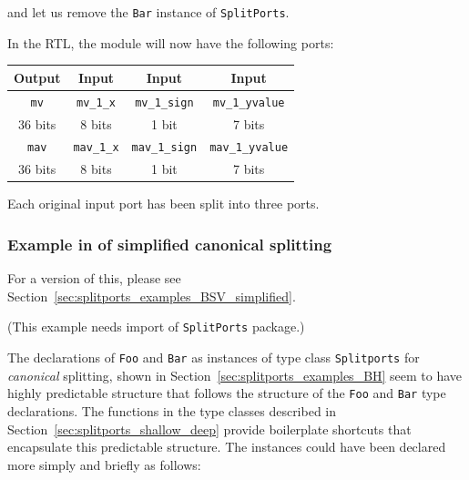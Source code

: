 and let us remove the {\tt Bar} instance of {\tt SplitPorts}.

In the RTL, the module will now have the following ports:

\begin{center}
  \begin{tabular}{|c||c|c|c|}
    \hline
     Output &
     Input  &
     Input  &
     Input  \\
    \hline
     {\tt mv}            &
     {\tt mv\_1\_x}      &
     {\tt mv\_1\_sign}   &
     {\tt mv\_1\_yvalue} \\
     36 bits &
      8 bits &
      1 bit  &
      7 bits \\
    \hline
     {\tt mav}            &
     {\tt mav\_1\_x}      &
     {\tt mav\_1\_sign}   &
     {\tt mav\_1\_yvalue} \\
     36 bits &
      8 bits &
      1 bit  &
      7 bits \\
    \hline
  \end{tabular}
\end{center}

Each original input port has been split into three ports.


\subsubsection{Example in {\BHb} of simplified canonical splitting}

\label{sec:splitports_examples_BH_simplified}


{\footnotesize  For a {\BSVb} version of this, please see
  Section~\ref{sec:splitports_examples_BSV_simplified}.}

{\footnotesize (This example needs import of {\tt SplitPorts} package.)}

The declarations of {\tt Foo} and {\tt Bar} as instances of type class
{\tt Splitports} for \emph{canonical} splitting, shown in
Section~\ref{sec:splitports_examples_BH} seem to have highly
predictable structure that follows the structure of the {\tt Foo} and
{\tt Bar} type declarations. The functions in the type classes
described in Section~\ref{sec:splitports_shallow_deep} provide
boilerplate shortcuts that encapsulate this predictable structure.
The instances could have been declared more simply and briefly as
follows:

